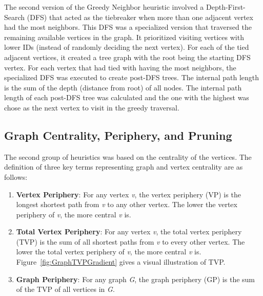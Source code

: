 \documentclass[twocolumn,showpacs,%
  nofootinbib,aps,superscriptaddress,%
  eqsecnum,prd,notitlepage,showkeys,11pt]{article}
\begin{document}
The second version of the Greedy Neighbor heuristic involved a Depth-First-Search (DFS) that acted as the tiebreaker when more than one adjacent vertex had the most neighbors. This DFS was a specialized version that traversed the remaining available vertices in the graph. It prioritized visiting vertices with lower IDs (instead of randomly deciding the next vertex). For each of the tied adjacent vertices, it created a tree graph with the root being the starting DFS vertex. For each vertex that had tied with having the most neighbors, the specialized DFS was executed to create post-DFS trees. The internal path length is the sum of the depth (distance from root) of all nodes. The internal path length of each post-DFS tree was calculated and the one with the highest was chose as the next vertex to visit in the greedy traversal. 

\subsection{Graph Centrality, Periphery, and Pruning}

The second group of heuristics was based on the centrality of the vertices. The definition of three key terms representing graph and vertex centrality are as follows:

\begin{enumerate}
    \item \textbf{Vertex Periphery}: For any vertex \textit{v}, the vertex periphery (VP) is the longest shortest path from \textit{v} to any other vertex. The lower the vertex periphery of \textit{v}, the more central \textit{v} is.

    \item \textbf{Total Vertex Periphery}:  For any vertex \textit{v}, the total vertex periphery (TVP) is the sum of all shortest paths from \textit{v} to every other vertex. The lower the total vertex periphery of \textit{v}, the more central \textit{v} is. Figure~\ref{fig:GraphTVPGradient} gives a visual illustration of TVP.

    \item \textbf{Graph Periphery}: For any graph \textit{G}, the graph periphery (GP) is the sum of the TVP of all vertices in \textit{G}.
\end{enumerate}
\end{document}
